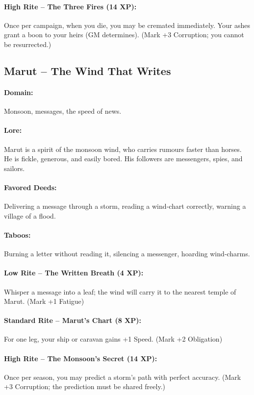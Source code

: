 \documentclass[11pt]{book}
\begin{document}
\paragraph{High Rite -- The Three Fires (14 XP):} Once per campaign, when you die, you may be cremated immediately. Your ashes grant a boon to your heirs (GM determines). (Mark +3 Corruption; you cannot be resurrected.)

\subsection{Marut -- The Wind That Writes}
\paragraph{Domain:} Monsoon, messages, the speed of news.
\paragraph{Lore:} Marut is a spirit of the monsoon wind, who carries rumours faster than horses. He is fickle, generous, and easily bored. His followers are messengers, spies, and sailors.
\paragraph{Favored Deeds:} Delivering a message through a storm, reading a wind‑chart correctly, warning a village of a flood.
\paragraph{Taboos:} Burning a letter without reading it, silencing a messenger, hoarding wind‑charms.
\paragraph{Low Rite -- The Written Breath (4 XP):} Whisper a message into a leaf; the wind will carry it to the nearest temple of Marut. (Mark +1 Fatigue)
\paragraph{Standard Rite -- Marut's Chart (8 XP):} For one leg, your ship or caravan gains +1 Speed. (Mark +2 Obligation)
\paragraph{High Rite -- The Monsoon's Secret (14 XP):} Once per season, you may predict a storm's path with perfect accuracy. (Mark +3 Corruption; the prediction must be shared freely.)
\end{document}
